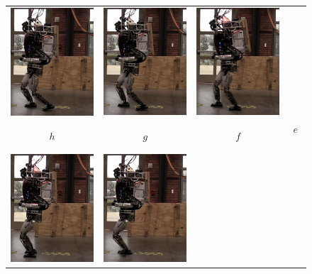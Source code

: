 \begin{figure}
\begin{tabular}{cccc}
    \includegraphics[width=1.4in]{STYLESTUFF/atw7} &
    \includegraphics[width=1.4in]{STYLESTUFF/atw6} &
     \includegraphics[width=1.4in]{STYLESTUFF/atw5} \\
     $h$ & $g$ & $f$ & $e$ ~\\[2ex]
    \includegraphics[width=1.4in]{STYLESTUFF/atw12} &
    \includegraphics[width=1.4in]{STYLESTUFF/atw11} &

\end{tabular}
\end{figure}
